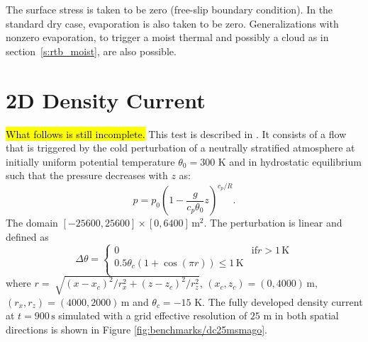 \documentclass{report}
\begin{document}
The surface stress is taken to be zero (free-slip boundary condition). In the standard dry case, evaporation is also taken to be zero. Generalizations with nonzero evaporation, to trigger a moist thermal and possibly a cloud as in section~\ref{s:rtb_moist}, are also possible. 

\section{2D Density Current}

\hl{What follows is still incomplete.}
This test is described in \cite{strakaWilhelmson1993}. It consists of a flow that is triggered by the cold perturbation of a neutrally stratified atmosphere at initially uniform potential temperature $\theta_0 = 300$ K
and in hydrostatic equilibrium such that the pressure decreases with $z$ as:
\begin{equation}
\label{pressureDistrib2}
p = p_{0}\left(1-\frac{g}{c_p{\theta_{0}}}z\right)^{c_p/R}.
\end{equation}
The domain $[-25600,25600]\times[0,6400]\,\mathrm{m}^2$.
The perturbation is linear and defined as
\begin{equation}
 \Delta\theta = \left\{ \begin{array}{ll}
 0 & \mathrm{if } r > 1\,{\mathrm K}\\
 0.5 \theta_c \left(1 + \cos(\pi r) \right) \leq 1\,{\mathrm K}\\
\end{array} \right.
\label{e:robertIni2}
\end{equation}
where $r = \sqrt[]{(x-x_{c})^2/r_x^{2} + (z-z_{c})^{2}/r_z^2}$, $(x_c,z_c) = (0,4000)\,\mathrm{m}$, $(r_x, r_z) = (4000, 2000)\,\mathrm{m}$ and $\theta_c=-15$ K. The fully developed density current at $t=900\,\mathrm{s}$ simulated with a grid effective resolution of $25$ m in both spatial directions is shown in Figure \ref{fig:benchmarks/dc25msmago}.
\end{document}
